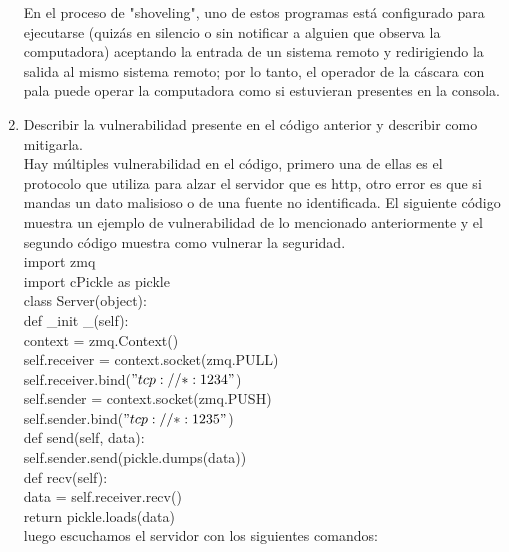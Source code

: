 \documentclass[a4paperx]{article}
\begin{document}
\begin{enumerate}
En el proceso de "shoveling", uno de estos programas está configurado para ejecutarse (quizás en silencio o sin notificar a alguien que observa la computadora) aceptando la entrada de un sistema remoto y redirigiendo la salida al mismo sistema remoto; por lo tanto, el operador de la cáscara con pala puede operar la computadora como si estuvieran presentes en la consola.\\

\item{Describir la vulnerabilidad presente en el c\'odigo anterior y describir como mitigarla.}\\

Hay m\'ultiples vulnerabilidad en el c\'odigo, primero una de ellas es el protocolo que utiliza para alzar el servidor que es http, otro error es que si mandas un dato malisioso o de una fuente no identificada. El siguiente c\'odigo muestra un ejemplo de  vulnerabilidad de lo mencionado anteriormente y el segundo c\'odigo muestra como vulnerar la seguridad.\\

import zmq\\

import cPickle as pickle\\

class Server(object):\\
 \quad  def \_init \_(self):\\
  \quad context = zmq.Context()\\

   \quad   self.receiver = context.socket(zmq.PULL)\\
    \quad  self.receiver.bind($"tcp://*:1234"$)\\

     \quad   self.sender = context.socket(zmq.PUSH)\\
    \quad    self.sender.bind($"tcp://*:1235"$)\\

    def send(self, data):\\
      \quad  self.sender.send(pickle.dumps(data))\\

    def recv(self):\\
    \quad    data = self.receiver.recv()\\
      \quad  return pickle.loads(data)\\
      
      
  luego escuchamos el servidor con los siguientes comandos:\\
  

\end{enumerate}
\end{document}
